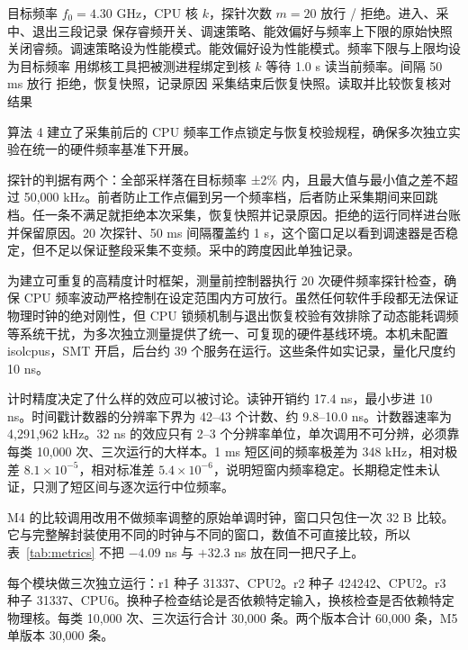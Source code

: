 \begin{algorithm}[H]
\caption{锁频控制与恢复核对}
\label{alg:frequency}
\begin{algorithmic}[1]
\Require 目标频率 $f_0=4.30$ GHz，CPU 核 $k$，探针次数 $m=20$
\Ensure 放行 / 拒绝。进入、采中、退出三段记录
\State 保存睿频开关、调速策略、能效偏好与频率上下限的原始快照
\State 关闭睿频。调速策略设为性能模式。能效偏好设为性能模式。频率下限与上限均设为目标频率
\State 用绑核工具把被测进程绑定到核 $k$
\State 等待 1.0 s
  \State 读当前频率。间隔 50 ms
\EndFor
{}
  \State 放行
\Else
  \State 拒绝，恢复快照，记录原因
\EndIf
\State 采集结束后恢复快照。读取并比较恢复核对结果
\end{algorithmic}
\end{algorithm}

算法 4 建立了采集前后的 CPU 频率工作点锁定与恢复校验规程，确保多次独立实验在统一的硬件频率基准下开展。

探针的判据有两个：全部采样落在目标频率 ±2\% 内，且最大值与最小值之差不超过 50,000 kHz。前者防止工作点偏到另一个频率档，后者防止采集期间来回跳档。任一条不满足就拒绝本次采集，恢复快照并记录原因。拒绝的运行同样进台账并保留原因。20 次探针、50 ms 间隔覆盖约 1 s，这个窗口足以看到调速器是否稳定，但不足以保证整段采集不变频。采中的跨度因此单独记录。

为建立可重复的高精度计时框架，测量前控制器执行 20 次硬件频率探针检查，确保 CPU 频率波动严格控制在设定范围内方可放行。虽然任何软件手段都无法保证物理时钟的绝对刚性，但 CPU 锁频机制与退出恢复校验有效排除了动态能耗调频等系统干扰，为多次独立测量提供了统一、可复现的硬件基线环境。本机未配置 isolcpus，SMT 开启，后台约 39 个服务在运行。这些条件如实记录，量化尺度约 10 ns。 %

计时精度决定了什么样的效应可以被讨论。读钟开销约 17.4 ns，最小步进 10 ns。时间戳计数器的分辨率下界为 42--43 个计数、约 9.8--10.0 ns。计数器速率为 4,291,962 kHz。32 ns 的效应只有 2--3 个分辨率单位，单次调用不可分辨，必须靠每类 10,000 次、三次运行的大样本。1 ms 短区间的频率极差为 348 kHz，相对极差 $8.1\times10^{-5}$，相对标准差 $5.4\times10^{-6}$，说明短窗内频率稳定。长期稳定性未认证，只测了短区间与逐次运行中位频率。 %

M4 的比较调用改用不做频率调整的原始单调时钟，窗口只包住一次 32 B 比较。它与完整解封装使用不同的时钟与不同的窗口，数值不可直接比较，所以表~\ref{tab:metrics} 不把 $-4.09$ ns 与 $+32.3$ ns 放在同一把尺子上。

每个模块做三次独立运行：r1 种子 31337、CPU2。r2 种子 424242、CPU2。r3 种子 31337、CPU6。换种子检查结论是否依赖特定输入，换核检查是否依赖特定物理核。每类 10,000 次、三次运行合计 30,000 条。两个版本合计 60,000 条，M5 单版本 30,000 条。 %

